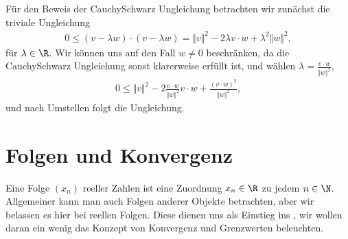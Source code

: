 \documentclass[letterpaper,10pt,english]{jupyterBook}
\begin{document}
Für den Beweis der Cauchy\sphinxhyphen{}Schwarz Ungleichung betrachten wir zunächst die triviale Ungleichung
\begin{equation*}
\begin{split} 0 \leq (v-\lambda w)\cdot (v-\lambda w) = \Vert v \Vert^2 - 2 \lambda v \cdot w + \lambda^2 \Vert w \Vert^2, \end{split}
\end{equation*}
für \(\lambda \in \R\). Wir können uns auf den Fall \(w \neq 0\) beschränken, da die Cauchy\sphinxhyphen{}Schwarz Ungleichung sonst klarerweise erfüllt ist, und wählen \(\lambda = \frac{v\cdot w}{\Vert w \Vert^2}\),
\begin{equation*}
\begin{split} 0 \leq  \Vert v \Vert^2 - 2 \frac{v\cdot w}{\Vert w \Vert^2}  v \cdot w + \frac{(v\cdot w)^2}{\Vert w \Vert^2} , \end{split}
\end{equation*}
und nach Umstellen folgt die Ungleichung.


\section{Folgen und Konvergenz}
\label{\detokenize{vorkurs/folgen:folgen-und-konvergenz}}\label{\detokenize{vorkurs/folgen::doc}}
Eine Folge \((x_n)\) reeller Zahlen ist eine Zuordnung \(x_n \in \R\) zu jedem \(n \in \N\). Allgemeiner kann man auch Folgen anderer Objekte betrachten, aber wir belassen es hier bei reellen Folgen. Diese dienen uns als Einstieg ins , wir wollen daran ein wenig das Konzept von Konvergenz und Grenzwerten beleuchten.
\end{document}
